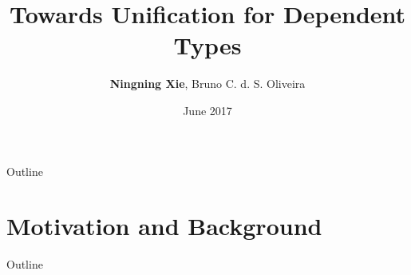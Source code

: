 \documentclass{beamer}
\title{Towards Unification for Dependent Types}
\author[N. Xie, B.C.d.S. Oliveira]
{\textbf{Ningning Xie}, Bruno C. d. S. Oliveira}
\institute[]{The University of Hong Kong}
\date[TFP 2017]{June 2017}
\begin{document}


\begin{frame}
  \titlepage
\end{frame}

\begin{frame}{Outline}
\tableofcontents
\end{frame}

\section{Motivation and Background}

\begin{frame}{Outline}
\tableofcontents[currentsection]
\end{frame}
\end{document}
